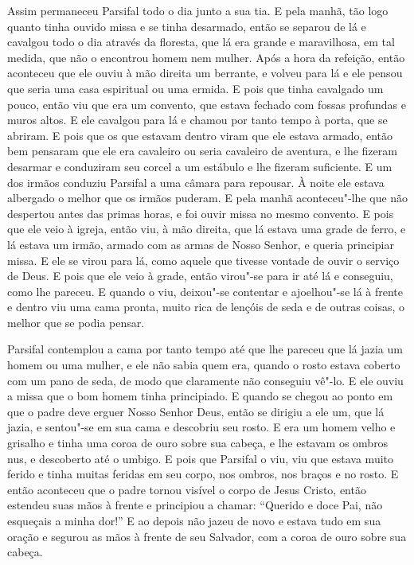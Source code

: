 Assim permaneceu Parsifal todo o dia junto a sua tia. E pela manhã, tão
logo quanto tinha ouvido missa e se tinha desarmado, então se separou de lá e
cavalgou todo o dia através da floresta, que lá era grande e maravilhosa, em
tal medida, que não o encontrou homem nem mulher. Após a hora da refeição,
então aconteceu que ele ouviu à mão direita um berrante, e volveu para lá e ele
pensou que seria uma casa espiritual ou uma ermida. E pois que tinha cavalgado
um pouco, então viu que era um convento, que estava fechado com fossas
profundas e muros altos. E ele cavalgou para lá e chamou por tanto tempo à
porta, que se abriram. E pois que os que estavam dentro viram que ele estava
armado, então bem pensaram que ele era cavaleiro ou seria cavaleiro de
aventura, e lhe fizeram desarmar e conduziram seu corcel a um estábulo e lhe
fizeram suficiente. E um dos irmãos conduziu Parsifal a uma câmara para
repousar. À noite ele estava albergado o melhor que os irmãos puderam. E pela
manhã aconteceu"-lhe que não despertou antes das primas horas, e foi ouvir missa
no mesmo convento. E pois que ele veio à igreja, então viu, à mão
direita, que lá estava uma grade de ferro, e lá estava um irmão, armado com as
armas de Nosso Senhor, e queria principiar missa. E ele se virou para lá, como
aquele que tivesse vontade de ouvir o serviço de Deus. E pois que ele veio à
grade, então virou"-se para ir até lá e conseguiu, como lhe pareceu. E quando o
viu, deixou"-se contentar e ajoelhou"-se lá à frente e dentro viu uma cama
pronta, muito rica de lençóis de seda e de outras coisas, o melhor que se podia
pensar.

Parsifal contemplou a cama por tanto tempo até que lhe pareceu que lá jazia
um homem ou uma mulher, e ele não sabia quem era, quando o rosto estava coberto
com um pano de seda, de modo que claramente não conseguiu vê"-lo. E ele ouviu a
missa que o bom homem tinha principiado. E quando se chegou ao ponto em que o
padre deve erguer Nosso Senhor Deus, então se dirigiu a ele um, que lá jazia, e
sentou"-se em sua cama e descobriu seu rosto. E era um homem velho e grisalho e
tinha uma coroa de ouro sobre sua cabeça, e lhe estavam os ombros nus, e
descoberto até o umbigo. E pois que Parsifal o viu, viu que estava muito
ferido e tinha muitas feridas em seu corpo, nos ombros,  nos braços e no
rosto. E então aconteceu que o padre tornou visível o corpo de Jesus Cristo,
então estendeu suas mãos à frente e principiou a chamar: “Querido e doce Pai,
não esqueçais a minha dor!” E ao depois não jazeu de novo e estava tudo em sua
oração e segurou as mãos à frente de seu Salvador, com a coroa de ouro sobre
sua cabeça.

